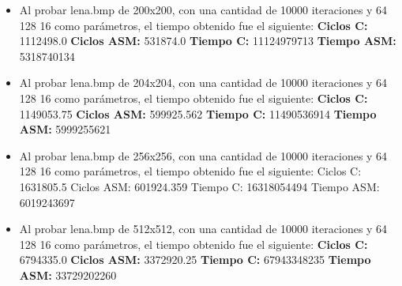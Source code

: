 \documentclass[10pt, a4paper]{article}
\begin{document}
\begin{itemize}
\begin{itemize}
\item{Al probar lena.bmp de 200x200, con una cantidad de 10000 iteraciones y 64 128 16 como parámetros, el tiempo obtenido fue el siguiente: \newline
\newline
\textbf{Ciclos C:}                  1112498.0\newline
\vspace{0.15cm}
\textbf{Ciclos ASM:}               531874.0\newline
\textbf{Tiempo C:}                 11124979713\newline
\textbf{Tiempo ASM:}               5318740134\newline}

\item{Al probar lena.bmp de 204x204, con una cantidad de 10000 iteraciones y 64 128 16 como parámetros, el tiempo obtenido fue el siguiente: \newline
\newline
\textbf{Ciclos C:}                 1149053.75\newline
\vspace{0.15cm}
\textbf{Ciclos ASM:}               599925.562\newline
\textbf{Tiempo C:}                 11490536914\newline
\textbf{Tiempo ASM:}               5999255621\newline}

\item{Al probar lena.bmp de 256x256, con una cantidad de 10000 iteraciones y 64 128 16 como parámetros, el tiempo obtenido fue el siguiente: \newline
\newline
Ciclos C:                 1631805.5\newline
\vspace{0.15cm}
Ciclos ASM:               601924.359\newline
Tiempo C:                 16318054494\newline
Tiempo ASM:               6019243697\newline}

\item{Al probar lena.bmp de 512x512, con una cantidad de 10000 iteraciones y 64 128 16 como parámetros, el tiempo obtenido fue el siguiente: \newline
\newline
\textbf{Ciclos C:}                  6794335.0\newline
\vspace{0.15cm}
\textbf{Ciclos ASM:}               3372920.25\newline
\textbf{Tiempo C:}                 67943348235\newline
\textbf{Tiempo ASM:}               33729202260\newline}


\end{itemize}
\end{itemize}
\end{document}

